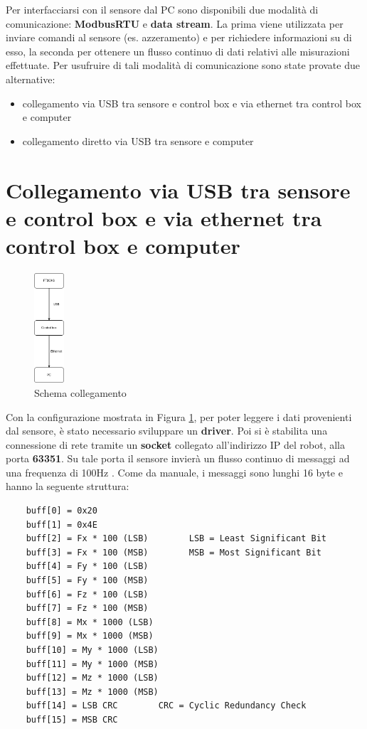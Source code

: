 Per interfacciarsi con il sensore dal PC sono disponibili due modalit\`{a} di comunicazione: \textbf{ModbusRTU} e \textbf{data stream}. 
La prima viene utilizzata per inviare comandi al sensore (es. azzeramento) e per richiedere informazioni su di esso, la seconda 
per ottenere un flusso continuo di dati relativi alle misurazioni effettuate. 
Per usufruire di tali modalit\`{a} di comunicazione sono state provate due alternative: 
\begin{itemize}
    \item collegamento via USB tra sensore e control box e via ethernet tra control box e computer
    \item collegamento diretto via USB tra sensore e computer
\end{itemize}
\section{Collegamento via USB tra sensore e control box e via ethernet tra control box e computer} \label{sec:scp}
\begin{figure}[H]
    \centering
    \includegraphics*[width=0.1\textwidth]{images/ft-cbox-pc.png}
    \caption{Schema collegamento}
    \label{fig:ft-cbox-pc}
\end{figure}
Con la configurazione mostrata in Figura \ref{fig:ft-cbox-pc}, per poter leggere i dati provenienti dal sensore, \`{e} stato 
necessario sviluppare un \textbf{driver}. 
Poi si \`{e} stabilita una connessione di rete tramite un \textbf{socket} collegato all'indirizzo IP del robot, 
alla porta \textbf{63351}. 
Su tale porta il sensore invier\`{a} un flusso continuo di messaggi ad una frequenza di 100Hz \cite{ft_sensor}. 
Come da manuale, i messaggi sono lunghi 16 byte e hanno la seguente struttura: 
\begin{verbatim}
    buff[0] = 0x20
    buff[1] = 0x4E
    buff[2] = Fx * 100 (LSB)        LSB = Least Significant Bit
    buff[3] = Fx * 100 (MSB)        MSB = Most Significant Bit
    buff[4] = Fy * 100 (LSB)
    buff[5] = Fy * 100 (MSB)
    buff[6] = Fz * 100 (LSB)
    buff[7] = Fz * 100 (MSB)
    buff[8] = Mx * 1000 (LSB)
    buff[9] = Mx * 1000 (MSB)
    buff[10] = My * 1000 (LSB)
    buff[11] = My * 1000 (MSB)
    buff[12] = Mz * 1000 (LSB)
    buff[13] = Mz * 1000 (MSB)
    buff[14] = LSB CRC        CRC = Cyclic Redundancy Check
    buff[15] = MSB CRC
\end{verbatim} 
